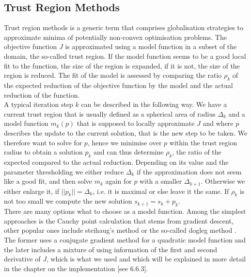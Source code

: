 \documentclass[../draft_1.tex]{subfiles}
\begin{document}
\subsection{Trust Region Methods}

Trust region methods is a generic term that comprises globalisation strategies to approximate minima of potentially non-convex optimisation problems. The objective function $J$ is approximated using a model function in a subset of the domain, the so-called trust region. If the model function seems to be a good local fit to the function, the size of the region is expanded, if it is not, the size of the region is reduced. The fit of the model is assessed by comparing the ratio $\rho_k$ of the expected reduction of the objective function by the model and the actual reduction of the function. 
\smallskip
\\
A typical iteration step $k$ can be described in the following way. We have a current trust region that is usually defined as a spherical area of radius $\Delta_k$ and a model function $m_k(p)$ that is supposed to locally approximate $J$ and where $p$ describes the update to the current solution, that is the new step to be taken. We therefore want to solve for $p$, hence we minimise over $p$ within the trust region radius to obtain a solution $p_k$ and can thus determine $\rho_k$, the ratio of the expected compared to the actual reduction. Depending on its value and the parameter thresholding we either reduce $\Delta_k$ if the approximation does not seem like a good fit, and then solve $m_k$ again for $p$ with a smaller $\Delta_{k+1}$. Otherwise we either enlarge it, if $|| p_k || = \Delta_k$, i.e. it is maximal or else leave it the same. If $\rho_k$ is not too small we compute the new solution $s_{k+1} = s_k + p_k$. 
\smallskip
\\
There are many options what to choose as a model function. Among the simplest approaches is the Cauchy point calculation that stems from gradient descent, other popular ones include steihaug's method or the so-called dogleg method \cite{NoceWrig99}. The former uses a conjugate gradient method for a quadratic model function and the later includes a mixture of using information of the first and second derivative of $J$, which is what we used and which will be explained in more detail in the chapter on the implementation [see 6.6.3].
 
\end{document}
